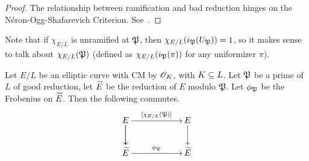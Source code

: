 \begin{proof}
The relationship between ramification and bad reduction hinges on the N\'eron-Ogg-Shafarevich Criterion. See~\cite[pg. 169-170]{Si94}.
\end{proof}
Note that if $\chi_{E/L}$ is unramified at $\mathfrak{P}$, then $\chi_{E/L}(i_{\mathfrak{P}}(U_{\mathfrak{P}}))=1$, so it makes sense to talk about $\chi_{E/L}(\mathfrak{P})$ (defined as $\chi_{E/L}(i_{\mathfrak{P}}(\pi))$ for any uniformizer $\pi$).
\begin{pr}
Let $E/L$ be an elliptic curve with CM by $\mathscr{O}_K$, with $K\subseteq L$. Let $\mathfrak{P}$ be a prime of $L$ of good reduction, let $\widetilde{E}$ be the reduction of $E$ modulo $\mathfrak{P}$. Let $\phi_{\mathfrak{P}}$ be the Frobenius on $\widetilde{E}$. 
Then the following commutes.
\[
\xymatrixcolsep{5pc}
\xymatrix{
E\ar[r]^{[\chi_{E/L}(\mP)]}\ar[d]
\ar[d] & E\ar[d]\\
\wt E\ar[r]^{\phi_{\mP}} & \wt E
}
\]
\end{pr}
